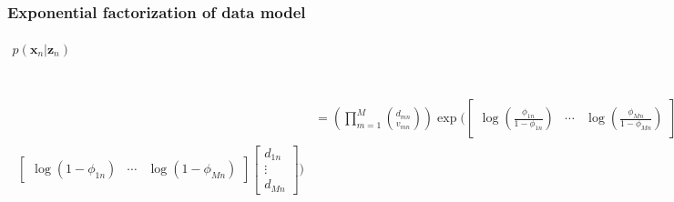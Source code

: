 \documentclass[11pt]{article}
\newcommand{\bx}{\ensuremath{\mathbf{x}}}
\newcommand{\bz}{\ensuremath{\mathbf{z}}}
\begin{document}
\subsubsection{Exponential factorization of data model}
\vspace{-0.5cm}
\begin{align}
p(\bx_n | \bz_n) &= \prod\limits_{m=1}^M \mathrm{Bin}(v_{mn}, \phi_{mn}; d_{mn}) \nonumber \\
				 &= \prod\limits_{m=1}^M \exp\left(v_{mn} \log\left(\frac{\phi_{mn}}{1 - \phi_{mn}}\right) + d_{mn} \log(1 - \phi_{mn}) \right) \nonumber \\				 		
\begin{split}
				&= \left( \prod\limits_{m=1}^M \binom{d_{mn}}{v_{mn}} \right)
				\exp\bigg( 
\begin{bmatrix}
         \log\left(\frac{\phi_{1n}}{1 - \phi_{1n}}\right) & \cdots & \log\left(\frac{\phi_{Mn}}{1 - \phi_{Mn}}\right)
        \end{bmatrix}\begin{bmatrix}
         v_{1n} \\ \vdots \\ v_{Mn}
        \end{bmatrix}  + \\
\begin{bmatrix}
         \log\left(1 - \phi_{1n}\right) & \cdots & \log\left(1 - \phi_{Mn}\right)
        \end{bmatrix}      
                \begin{bmatrix}
         d_{1n} \\ \vdots \\ d_{Mn}
        \end{bmatrix} 
        \bigg)
        \end{split} \\
&=    \left( \prod\limits_{m=1}^M \binom{d_{mn}}{v_{mn}} \right)
			 \exp\bigg(
			\begin{bmatrix}
				\begin{bmatrix}
				 v_{1n} &  d_{1n} )
				\end{bmatrix} & \cdots &
				\begin{bmatrix}
				 v_{Mn} &  d_{Mn}
				\end{bmatrix}
			\end{bmatrix}
			\begin{bmatrix}
				\begin{bmatrix}
					\log\left(1 - \phi_{1n}\right) \\ \log\left(\frac{\phi_{1n}}{1 - \phi_{1n}}\right)
				\end{bmatrix} \\
				\vdots \\
				\begin{bmatrix}
					\log\left(1 - \phi_{Mn}\right) \\ \log\left(\frac{\phi_{Mn}}{1 - \phi_{Mn}}\right)
				\end{bmatrix}
			\end{bmatrix} \\
\end{align}
\end{document}
